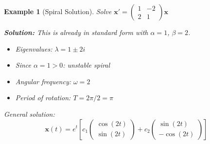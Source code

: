 \documentclass[12pt]{article}
\newtheorem{example}{Example}
\begin{document}
\begin{example}[Spiral Solution]
Solve $\mathbf{x}' = \begin{pmatrix} 1 & -2 \\ 2 & 1 \end{pmatrix}\mathbf{x}$

\textbf{Solution:}
This is already in standard form with $\alpha = 1$, $\beta = 2$.
\begin{itemize}
\item Eigenvalues: $\lambda = 1 \pm 2i$
\item Since $\alpha = 1 > 0$: unstable spiral
\item Angular frequency: $\omega = 2$
\item Period of rotation: $T = 2\pi/2 = \pi$
\end{itemize}

General solution:
\[\mathbf{x}(t) = e^{t}\left[c_{1}\begin{pmatrix} \cos(2t) \\ \sin(2t) \end{pmatrix} + c_{2}\begin{pmatrix} \sin(2t) \\ -\cos(2t) \end{pmatrix}\right]\]
\end{example}
\end{document}
